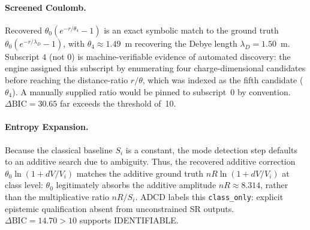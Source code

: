 \documentclass{article}
\begin{document}
\begin{table}[ht]
  \small
  \caption{Four-step validation results for all three scenarios.
  PC = Positive Control (pass/fail).
  $\Delta\mathrm{BIC} = \mathrm{BIC}_{\mathrm{ablated}} - \mathrm{BIC}_{\mathrm{best}}$,
  where $\mathrm{BIC}_{\mathrm{best}}$ is the Rank-1 domain-guided search BIC;
  positive values indicate the full-primitive set is preferred over the ablated set.
  Match level: \textit{exact} = symbolic equivalence verified;
  \textit{class} = correct functional family confirmed; amplitude absorbs
  unverifiable physical constants.}
  \label{tab:results}
  \centering
\end{table}

\paragraph{Screened Coulomb.}
Recovered $\theta_0(e^{-r/\theta_4}-1)$ is an exact symbolic match to the
ground truth $\theta_0(e^{-r/\lambda_D}-1)$, with $\theta_4\approx1.49$~m
recovering the Debye length $\lambda_D=1.50$~m.
Subscript $4$ (not $0$) is machine-verifiable evidence of automated discovery:
the engine assigned this subscript by enumerating four charge-dimensional
candidates before reaching the distance-ratio $r/\theta$, which was indexed
as the fifth candidate ($\theta_4$).
A manually supplied ratio would be pinned to subscript~$0$ by convention.
$\Delta\mathrm{BIC}=30.65$ far exceeds the threshold of~10.

\paragraph{Entropy Expansion.}
Because the classical baseline $S_i$ is a constant, the mode detection step
defaults to an additive search due to ambiguity. Thus, the recovered additive
correction $\theta_0\ln(1+dV/V_i)$ matches the additive ground truth
$nR\ln(1+dV/V_i)$ at class level: $\theta_0$ legitimately absorbs the additive
amplitude $nR \approx 8.314$, rather than the multiplicative ratio $nR/S_i$.
ADCD labels this \texttt{class\_only}: explicit epistemic qualification absent
from unconstrained SR outputs.
$\Delta\mathrm{BIC}=14.70>10$ supports IDENTIFIABLE.
\end{document}
